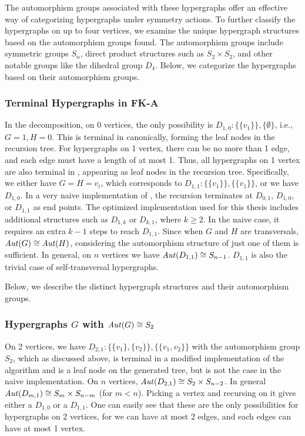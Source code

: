 The automorphism groups associated with these hypergraphs offer an effective way of categorizing hypergraphs under symmetry actions. To further classify the hypergraphs on up to four vertices, we examine the unique hypergraph structures based on the automorphism groups found. The automorphism groups include symmetric groups $S_n$, direct product structures such as $S_2\times S_2$, and other notable groups like the dihedral group $D_4$. Below, we categorize the hypergraphs based on their automorphism groups.

\subsubsection*{Terminal Hypergraphs in FK-A}

In the \FKA{} decomposition, on 0 vertices, the only possibility is $D_{1,0}:\{\{v_1\}\},\{\emptyset\}$, i.e., $G=1,H=0$. This is terminal in \FKA{} canonically, forming the leaf nodes in the recursion tree. For hypergraphs on 1 vertex, there can be no more than 1 edge, and each edge must have a length of at most 1. Thus, all hypergraphs on 1 vertex are also terminal in \FKA, appearing as leaf nodes in the recursion tree. Specifically, we either have $G=H=v_i$, which corresponds to $D_{1,1}:\{\{v_1\}\},\{\{v_1\}\}$, or we have $D_{1,0}$. In a very naive implementation of \FKA, the recursion terminates at $D_{0,1}$, $D_{1,0}$, or $D_{1,1}$ as end points. The optimized implementation used for this thesis includes additional structures such as $D_{1,k}$ or $D_{k,1}$, where $k\geq 2$. In the naive case, it requires an extra $k-1$ steps to reach $D_{1,1}$. Since when $G$ and $H$ are transversals, $\mathit{Aut}(G)\cong\mathit{Aut}(H)$, considering the automorphism structure of just one of them is sufficient. In general, on $n$ vertices we have $\mathit{Aut}(D_{1,1})\cong S_{n-1}$. $D_{1,1}$ is also the trivial case of self-transversal hypergraphs.

Below, we describe the distinct hypergraph structures and their automorphism groups.

\subsubsection*{Hypergraphs $G$ with $\mathit{Aut}(G)\cong S_2$}

On 2 vertices, we have $D_{2,1}:\{\{v_1\},\{v_2\}\},\{\{v_1,v_2\}\}$ with the automorphism group $S_2$, which as discussed above, is terminal in a modified implementation of the algorithm and is a leaf node on the generated tree, but is not the case in the naive implementation. On $n$ vertices, $\mathit{Aut}(D_{2,1})\cong S_2\times S_{n-2}$. In general $\mathit{Aut}(D_{m,1})\cong S_m\times S_{n-m}$ (for $m<n$). Picking a vertex and recursing on it gives either a $D_{1,0}$ or a $D_{1,1}$. One can easily see that these are the only possibilities for hypergraphs on 2 vertices, for we can have at most 2 edges, and each edges can have at most 1 vertex.

